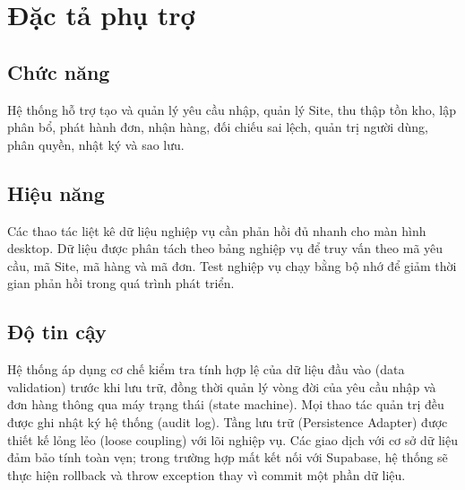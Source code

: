 \section{Đặc tả phụ trợ}

\subsection{Chức năng}

Hệ thống hỗ trợ tạo và quản lý yêu cầu nhập, quản lý Site, thu thập tồn kho, lập phân bổ, phát hành đơn, nhận hàng, đối chiếu sai lệch, quản trị người dùng, phân quyền, nhật ký và sao lưu.

\subsection{Hiệu năng}

Các thao tác liệt kê dữ liệu nghiệp vụ cần phản hồi đủ nhanh cho màn hình desktop. Dữ liệu được phân tách theo bảng nghiệp vụ để truy vấn theo mã yêu cầu, mã Site, mã hàng và mã đơn. Test nghiệp vụ chạy bằng bộ nhớ để giảm thời gian phản hồi trong quá trình phát triển.

\subsection{Độ tin cậy}

Hệ thống áp dụng cơ chế kiểm tra tính hợp lệ của dữ liệu đầu vào (data validation) trước khi lưu trữ, đồng thời quản lý vòng đời của yêu cầu nhập và đơn hàng thông qua máy trạng thái (state machine). Mọi thao tác quản trị đều được ghi nhật ký hệ thống (audit log). Tầng lưu trữ (Persistence Adapter) được thiết kế lỏng lẻo (loose coupling) với lõi nghiệp vụ. Các giao dịch với cơ sở dữ liệu đảm bảo tính toàn vẹn; trong trường hợp mất kết nối với Supabase, hệ thống sẽ thực hiện rollback và throw exception thay vì commit một phần dữ liệu.
